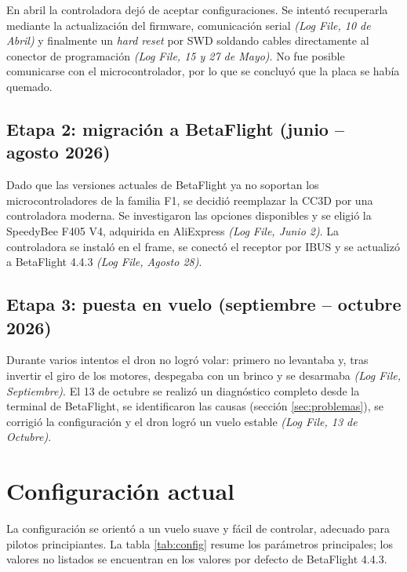 \documentclass[11pt,letterpaper]{article}
\newcommand{\logref}[1]{\textit{(Log File, #1)}}
\begin{document}
En abril la controladora dejó de aceptar configuraciones. Se intentó recuperarla mediante la actualización del firmware, comunicación serial \logref{10 de Abril} y finalmente un \textit{hard reset} por SWD soldando cables directamente al conector de programación \logref{15 y 27 de Mayo}. No fue posible comunicarse con el microcontrolador, por lo que se concluyó que la placa se había quemado.

\subsection{Etapa 2: migración a BetaFlight (junio -- agosto 2026)}
Dado que las versiones actuales de BetaFlight ya no soportan los microcontroladores de la familia F1, se decidió reemplazar la CC3D por una controladora moderna. Se investigaron las opciones disponibles y se eligió la SpeedyBee F405 V4, adquirida en AliExpress \logref{Junio 2}. La controladora se instaló en el frame, se conectó el receptor por IBUS y se actualizó a BetaFlight 4.4.3 \logref{Agosto 28}.

\subsection{Etapa 3: puesta en vuelo (septiembre -- octubre 2026)}
Durante varios intentos el dron no logró volar: primero no levantaba y, tras invertir el giro de los motores, despegaba con un brinco y se desarmaba \logref{Septiembre}. El 13 de octubre se realizó un diagnóstico completo desde la terminal de BetaFlight, se identificaron las causas (sección \ref{sec:problemas}), se corrigió la configuración y el dron logró un vuelo estable \logref{13 de Octubre}.

\section{Configuración actual}
La configuración se orientó a un vuelo suave y fácil de controlar, adecuado para pilotos principiantes. La tabla \ref{tab:config} resume los parámetros principales; los valores no listados se encuentran en los valores por defecto de BetaFlight 4.4.3.
\end{document}
